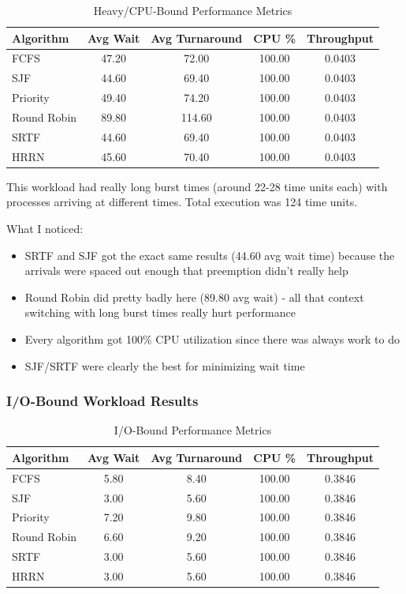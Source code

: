\documentclass[12pt,letterpaper]{article}
\begin{document}
\begin{table}[H]
\centering
\caption{Heavy/CPU-Bound Performance Metrics}
\begin{tabular}{@{}lcccc@{}}
\toprule
\textbf{Algorithm} & \textbf{Avg Wait} & \textbf{Avg Turnaround} & \textbf{CPU \%} & \textbf{Throughput} \\ \midrule
FCFS & 47.20 & 72.00 & 100.00 & 0.0403 \\
SJF & 44.60 & 69.40 & 100.00 & 0.0403 \\
Priority & 49.40 & 74.20 & 100.00 & 0.0403 \\
Round Robin & 89.80 & 114.60 & 100.00 & 0.0403 \\
SRTF & 44.60 & 69.40 & 100.00 & 0.0403 \\
HRRN & 45.60 & 70.40 & 100.00 & 0.0403 \\ \bottomrule
\end{tabular}
\end{table}

This workload had really long burst times (around 22-28 time units each) with 
processes arriving at different times. Total execution was 124 time units.

What I noticed:
\begin{itemize}
    \item SRTF and SJF got the exact same results (44.60 avg wait time) because 
    the arrivals were spaced out enough that preemption didn't really help
    \item Round Robin did pretty badly here (89.80 avg wait) - all that context 
    switching with long burst times really hurt performance
    \item Every algorithm got 100\% CPU utilization since there was always work to do
    \item SJF/SRTF were clearly the best for minimizing wait time
\end{itemize}

\subsubsection{I/O-Bound Workload Results}

\begin{table}[H]
\centering
\caption{I/O-Bound Performance Metrics}
\begin{tabular}{@{}lcccc@{}}
\toprule
\textbf{Algorithm} & \textbf{Avg Wait} & \textbf{Avg Turnaround} & \textbf{CPU \%} & \textbf{Throughput} \\ \midrule
FCFS & 5.80 & 8.40 & 100.00 & 0.3846 \\
SJF & 3.00 & 5.60 & 100.00 & 0.3846 \\
Priority & 7.20 & 9.80 & 100.00 & 0.3846 \\
Round Robin & 6.60 & 9.20 & 100.00 & 0.3846 \\
SRTF & 3.00 & 5.60 & 100.00 & 0.3846 \\
HRRN & 3.00 & 5.60 & 100.00 & 0.3846 \\ \bottomrule
\end{tabular}
\end{table}
\end{document}
